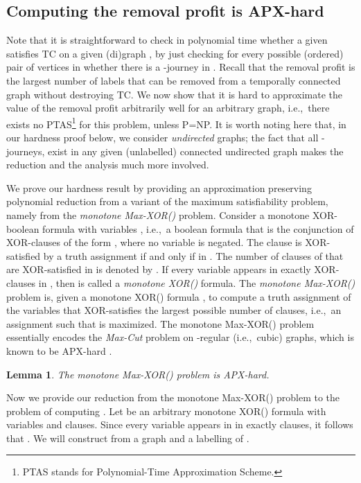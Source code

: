 \documentclass[a4paper,UKenglish]{article}
\newtheorem{lemma}{Lemma}
\begin{document}
\subsection{Computing the removal profit is APX-hard}


Note that it is straightforward to check in polynomial time whether a given  satisfies TC on a given (di)graph , by just checking for every possible
(ordered) pair  of vertices in  whether there is a -journey in . Recall that the removal profit is the largest number of labels that can be removed from a temporally connected graph without destroying TC. We now show that it is hard to approximate the value of the removal profit arbitrarily well for an arbitrary
graph, i.e.,~there exists no PTAS\footnote{PTAS stands for Polynomial-Time Approximation Scheme.} for this problem, unless P=NP. It is worth noting here that, in our hardness proof below, we consider \emph{undirected} graphs; the fact that all -journeys,  exist in any given (unlabelled) connected undirected graph makes the reduction and the analysis much more involved.

We prove our hardness result by providing an approximation preserving
polynomial reduction from a variant of the maximum satisfiability problem,
namely from the \emph{monotone Max-XOR()} problem. Consider a monotone
XOR-boolean formula  with variables ,
i.e.,~a boolean formula that is the conjunction of XOR-clauses of the form , where no variable is negated. The clause  is XOR-satisfied by a truth assignment  if and
only if  in . The number of clauses of  that
are XOR-satisfied in  is denoted by . If every
variable  appears in exactly  XOR-clauses in , then 
is called a \emph{monotone XOR(}\emph{)} formula. The \emph{monotone
Max-XOR(}\emph{)} problem is, given a monotone XOR() formula ,
to compute a truth assignment  of the variables  that XOR-satisfies the largest possible number of clauses, i.e.,~an
assignment  such that  is maximized. The monotone
Max-XOR() problem essentially encodes the \emph{Max-Cut} problem on -regular (i.e.,~cubic) graphs, which is known to be APX-hard \cite{Alimonti}.

\begin{lemma}\hspace{-0,01cm}\protect\cite{Alimonti}
\label{Max_XOR-3-hard-lem}The monotone Max-XOR() problem is APX-hard.
\end{lemma}

Now we provide our reduction from the monotone Max-XOR() problem to the
problem of computing . Let  be an arbitrary monotone XOR() formula 
with  variables  and  clauses. 
Since every variable  appears in  in
exactly  clauses, it follows that . We will construct
from  a graph  and a
labelling  of . 
\end{document}
